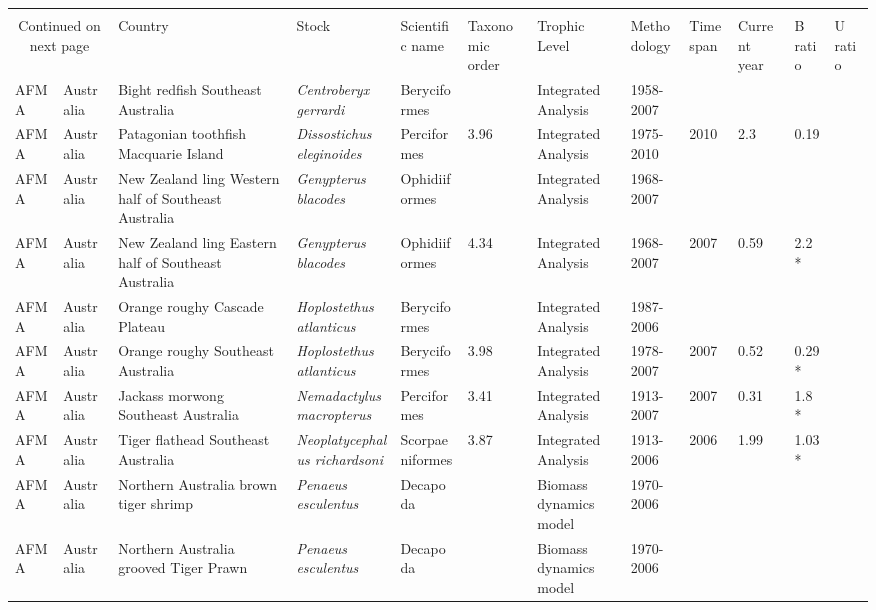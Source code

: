 \begin{longtable}{p{1.5cm}p{1.5cm}p{3cm}p{3cm}p{2.5cm}p{0.9cm}p{1.4cm}p{0.9cm}p{0.9cm}p{0.9cm}p{1cm}}
  \bottomrule \\ \multicolumn{2}{c}{Continued on next page} \endfoot \endlastfoot
Management & Country & Stock & Scientific name & Taxonomic order & Trophic Level & Methodology & Timespan & Current year & B ratio & U ratio  \\ \midrule \endhead
AFMA & Australia & Bight redfish Southeast Australia & \textit{Centroberyx gerrardi} & Beryciformes &  & Integrated Analysis & 1958-2007 &  &  &  \\ 
  AFMA & Australia & Patagonian toothfish Macquarie Island & \textit{Dissostichus eleginoides} & Perciformes & 3.96 & Integrated Analysis & 1975-2010 & 2010 & 2.3 & 0.19 \\ 
  AFMA & Australia & New Zealand ling Western half of Southeast Australia & \textit{Genypterus blacodes} & Ophidiiformes &  & Integrated Analysis & 1968-2007 &  &  &  \\ 
  AFMA & Australia & New Zealand ling Eastern half of Southeast Australia & \textit{Genypterus blacodes} & Ophidiiformes & 4.34 & Integrated Analysis & 1968-2007 & 2007 & 0.59 & 2.2 * \\ 
  AFMA & Australia & Orange roughy Cascade Plateau & \textit{Hoplostethus atlanticus} & Beryciformes &  & Integrated Analysis & 1987-2006 &  &  &  \\ 
  AFMA & Australia & Orange roughy Southeast Australia & \textit{Hoplostethus atlanticus} & Beryciformes & 3.98 & Integrated Analysis & 1978-2007 & 2007 & 0.52 & 0.29 * \\ 
  AFMA & Australia & Jackass morwong Southeast Australia & \textit{Nemadactylus macropterus} & Perciformes & 3.41 & Integrated Analysis & 1913-2007 & 2007 & 0.31 & 1.8 * \\ 
  AFMA & Australia & Tiger flathead Southeast Australia & \textit{Neoplatycephalus richardsoni} & Scorpaeniformes & 3.87 & Integrated Analysis & 1913-2006 & 2006 & 1.99 & 1.03 * \\ 
  AFMA & Australia & Northern Australia brown tiger shrimp & \textit{Penaeus esculentus} & Decapoda &  & Biomass dynamics model & 1970-2006 &  &  &  \\ 
  AFMA & Australia & Northern Australia grooved Tiger Prawn & \textit{Penaeus esculentus} & Decapoda &  & Biomass dynamics model & 1970-2006 &  &  &  \\ 

\end{longtable}
